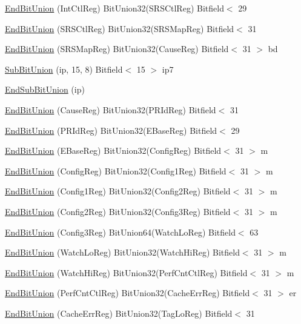 \begin{DoxyCompactItemize}
\hyperlink{namespaceMipsISA_adae0c4656edafa9a1a60ea6f8623602b}{EndBitUnion} (IntCtlReg) BitUnion32(SRSCtlReg) Bitfield$<$ 29
\item 
\hyperlink{namespaceMipsISA_ac8ad39b298f45f7a6c0199e74940fd72}{EndBitUnion} (SRSCtlReg) BitUnion32(SRSMapReg) Bitfield$<$ 31
\item 
\hyperlink{namespaceMipsISA_a8197bb167f73b2ba92a556b54d35c247}{EndBitUnion} (SRSMapReg) BitUnion32(CauseReg) Bitfield$<$ 31 $>$ bd
\item 
\hyperlink{namespaceMipsISA_aebb7b725b738cf03d41045fe15187006}{SubBitUnion} (ip, 15, 8) Bitfield$<$ 15 $>$ ip7
\item 
\hyperlink{namespaceMipsISA_acb2250639af71811d86378b81ff254b0}{EndSubBitUnion} (ip)
\item 
\hyperlink{namespaceMipsISA_aaf9dde73d3cec4f4299b5b866a53975f}{EndBitUnion} (CauseReg) BitUnion32(PRIdReg) Bitfield$<$ 31
\item 
\hyperlink{namespaceMipsISA_ab70b4ed27a0905d02b3e81907e8198b7}{EndBitUnion} (PRIdReg) BitUnion32(EBaseReg) Bitfield$<$ 29
\item 
\hyperlink{namespaceMipsISA_a76be583b407d10bf151b7d44b33d9fbe}{EndBitUnion} (EBaseReg) BitUnion32(ConfigReg) Bitfield$<$ 31 $>$ m
\item 
\hyperlink{namespaceMipsISA_aa56e600b9c6344fc7fd639bb6779378e}{EndBitUnion} (ConfigReg) BitUnion32(Config1Reg) Bitfield$<$ 31 $>$ m
\item 
\hyperlink{namespaceMipsISA_a14d2f00833660e452a0f7efb07dcea19}{EndBitUnion} (Config1Reg) BitUnion32(Config2Reg) Bitfield$<$ 31 $>$ m
\item 
\hyperlink{namespaceMipsISA_afdd998372394702fe2de2e4d5a0480f9}{EndBitUnion} (Config2Reg) BitUnion32(Config3Reg) Bitfield$<$ 31 $>$ m
\item 
\hyperlink{namespaceMipsISA_a58a2abbc3433688e1ee0083a7dd7001b}{EndBitUnion} (Config3Reg) BitUnion64(WatchLoReg) Bitfield$<$ 63
\item 
\hyperlink{namespaceMipsISA_a1b5b420a450d8d1d2436f7c8558e65c2}{EndBitUnion} (WatchLoReg) BitUnion32(WatchHiReg) Bitfield$<$ 31 $>$ m
\item 
\hyperlink{namespaceMipsISA_ae140b2b16da5e91f8048be7ae8764a4a}{EndBitUnion} (WatchHiReg) BitUnion32(PerfCntCtlReg) Bitfield$<$ 31 $>$ m
\item 
\hyperlink{namespaceMipsISA_aad6da03f58562dcac647243534841a82}{EndBitUnion} (PerfCntCtlReg) BitUnion32(CacheErrReg) Bitfield$<$ 31 $>$ er
\item 
\hyperlink{namespaceMipsISA_a78f47097e3bcf7a332c355f3e830c0f0}{EndBitUnion} (CacheErrReg) BitUnion32(TagLoReg) Bitfield$<$ 31
\end{DoxyCompactItemize}

